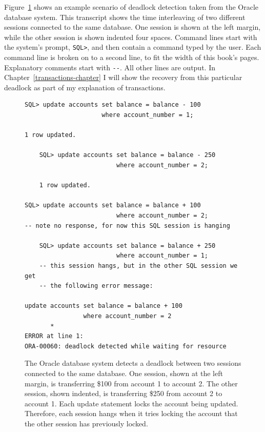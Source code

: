 Figure~\ref{oracle-deadlock} shows an example scenario of deadlock
detection taken from the Oracle database system.
This transcript shows the time interleaving of two
different sessions connected to the same database.  One session is
shown at the left margin, while the other session is shown indented
four spaces.  Command lines start with the system's prompt,
\texttt{SQL>}, and then contain a command typed by the user.  Each
command line is broken on to a second line, to fit the width of this
book's pages.
Explanatory comments start with \texttt{-{}-}.  All other lines are
output.
In Chapter~\ref{transactions-chapter} I will show the recovery from this particular
deadlock as part of my explanation of transactions.
\begin{figure}
\begin{verbatim}
SQL> update accounts set balance = balance - 100
                     where account_number = 1;

1 row updated.

    SQL> update accounts set balance = balance - 250
                         where account_number = 2;

    1 row updated.

SQL> update accounts set balance = balance + 100 
                         where account_number = 2;
-- note no response, for now this SQL session is hanging

    SQL> update accounts set balance = balance + 250 
                         where account_number = 1;
    -- this session hangs, but in the other SQL session we get
    -- the following error message:

update accounts set balance = balance + 100 
                where account_number = 2
       *
ERROR at line 1:
ORA-00060: deadlock detected while waiting for resource 
\end{verbatim}
\caption{The Oracle database
  system detects a deadlock between two sessions connected to the same
  database.  One session, shown at the left margin, is transferring \$100
  from account 1 to account 2.  The other session, shown indented, is
  transferring \$250 from account 2 to account 1.  Each update statement
  locks the account being updated.  Therefore, each session hangs when it
  tries locking the account that the other session has previously locked.}
\label{oracle-deadlock}
\end{figure}

